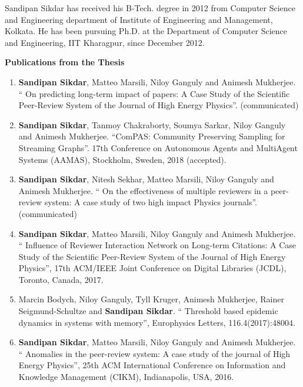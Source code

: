 
\noindent Sandipan Sikdar has received his B-Tech. degree in 2012 from Computer Science and Engineering department of Institute of Engineering and Management, Kolkata. He has been pursuing Ph.D. at the Department of Computer Science and Engineering, IIT Kharagpur, since
December 2012. 
  


\singlespace
\begin{center}
\vspace{0.3cm}
{\bfseries {\large Publications from the Thesis
}}
\vspace{0.3cm}
\end{center}

\begin{enumerate}
\item  {\bf Sandipan Sikdar}, Matteo Marsili, Niloy Ganguly and Animesh Mukherjee. `` On predicting long-term impact of papers: A Case Study of the Scientific Peer-Review System of the Journal of High Energy Physics''. (communicated)
\item  {\bf Sandipan Sikdar}, Tanmoy Chakraborty, Soumya Sarkar, Niloy Ganguly and Animesh Mukherjee. ``ComPAS: Community Preserving Sampling for Streaming Graphs''. 17th Conference on Autonomous Agents and MultiAgent Systems (AAMAS), Stockholm, Sweden, 2018 (accepted).
\item  {\bf Sandipan Sikdar}, Nitesh Sekhar, Matteo Marsili, Niloy Ganguly and Animesh Mukherjee. `` On the effectiveness of multiple reviewers in a peer-review system: A case study of two high impact Physics journals''. (communicated)
 \item  {\bf Sandipan Sikdar}, Matteo Marsili, Niloy Ganguly and Animesh Mukherjee. `` Influence of Reviewer Interaction Network on Long-term Citations: A Case Study of the Scientific Peer-Review System of the Journal of High Energy Physics'', 17th ACM/IEEE Joint Conference on Digital Libraries (JCDL), Toronto, Canada, 2017. 
   \item  Marcin Bodych, Niloy Ganguly, Tyll Kruger, Animesh Mukherjee, Rainer Seigmund-Schultze and {\bf Sandipan Sikdar}. `` Threshold based epidemic dynamics in systems with memory'', Europhysics Letters, 116.4(2017):48004. 
   \item  {\bf Sandipan Sikdar}, Matteo Marsili, Niloy Ganguly and Animesh Mukherjee. `` Anomalies in the peer-review system: A case study of the journal of High Energy Physics'', 25th ACM International Conference on Information and Knowledge Management (CIKM), Indianapolis, USA, 2016.

\end{enumerate}
